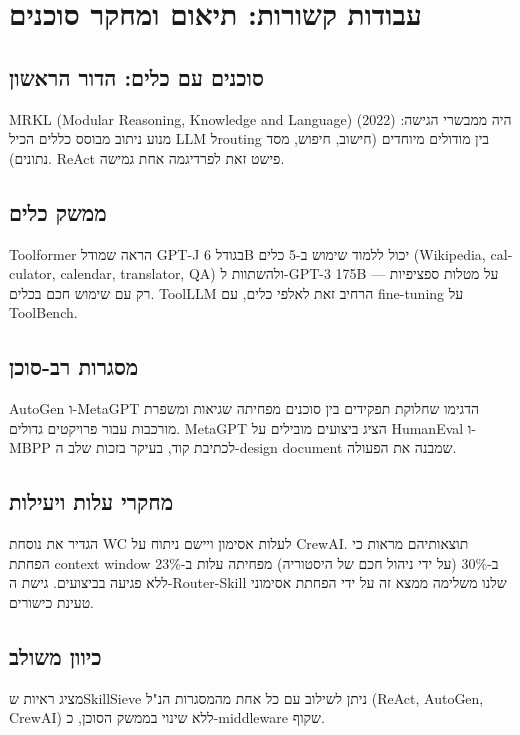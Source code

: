 
\chapter{עבודות קשורות: תיאום ומחקר סוכנים}

\section{סוכנים עם כלים: הדור הראשון}

\textenglish{MRKL} (\textenglish{Modular Reasoning, Knowledge and Language}) (2022) היה ממבשרי הגישה: מנוע ניתוב מבוסס כללים הכיל \textenglish{LLM} ל\textenglish{routing} בין מודולים מיוחדים (חישוב, חיפוש, מסד נתונים). \textenglish{ReAct} \cite{yao2022react} פישט זאת לפרדיגמה אחת גמישה.

\section{ממשק כלים}

\textenglish{Toolformer} \cite{schick2023toolformer} הראה שמודל \textenglish{GPT-J} בגודל \textenglish{6B} יכול ללמוד שימוש ב-5 כלים (\textenglish{Wikipedia, calculator, calendar, translator, QA}) ולהשתוות ל-\textenglish{GPT-3 175B} על מטלות ספציפיות --- רק עם שימוש חכם בכלים. \textenglish{ToolLLM} \cite{qin2023toolllm} הרחיב זאת לאלפי כלים, עם \textenglish{fine-tuning} על \textenglish{ToolBench}.

\section{מסגרות רב-סוכן}

\textenglish{AutoGen} \cite{wu2023autogen} ו-\textenglish{MetaGPT} \cite{hong2023metagpt} הדגימו שחלוקת תפקידים בין סוכנים מפחיתה שגיאות ומשפרת מורכבות עבור פרויקטים גדולים. \textenglish{MetaGPT} הציג ביצועים מובילים על \textenglish{HumanEval} ו-\textenglish{MBPP} לכתיבת קוד, בעיקר בזכות שלב ה-\textenglish{design document} שמבנה את הפעולה.

\section{מחקרי עלות ויעילות}

\cite{segal2024orchestration} הגדיר את נוסחת \textenglish{WC} לעלות אסימון ויישם ניתוח על \textenglish{CrewAI}. תוצאותיהם מראות כי הפחתת \textenglish{context window} ב-\textenglish{30\%} (על ידי ניהול חכם של היסטוריה) מפחיתה עלות ב-\textenglish{23\%} ללא פגיעה בביצועים. גישת ה-\textenglish{Router-Skill} שלנו משלימה ממצא זה על ידי הפחתת אסימוני טעינת כישורים.

\section{כיוון משולב}

\cite{nakash2024skillsieve} מציג ראיות ש\textenglish{SkillSieve} ניתן לשילוב עם כל אחת מהמסגרות הנ"ל (ReAct, AutoGen, CrewAI) ללא שינוי בממשק הסוכן, כ-\textenglish{middleware} שקוף.
